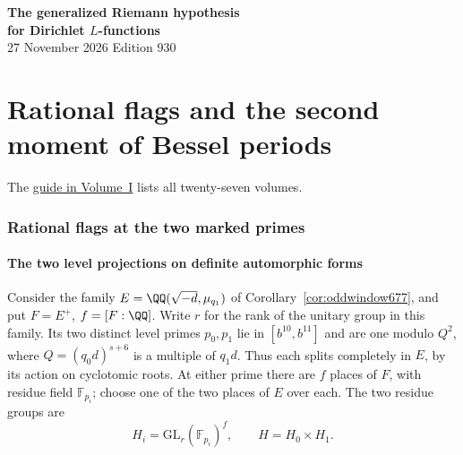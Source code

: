 \documentclass[a4paper,11pt]{article}
\theoremstyle{definition}
\theoremstyle{remark}
\numberwithin{equation}{section}
\begin{document}
\setcounter{part}{24}
\thispagestyle{plain}\begin{center}
{\LARGE\bfseries The generalized Riemann hypothesis\\[2pt]for Dirichlet \(L\)-functions}\\[6pt]
{\small 27 November 2026 \quad\textperiodcentered\quad Edition 930}\end{center}
\part{Rational flags and the second moment of Bessel periods}\label{part:XXV}
\begin{abstract}\noindent We count pairs of rational flags, separate the open and closed orbital integrals and construct the real test vector near a stationary point. The resulting Poincar\'e series give a second moment on the marked classes. Its terminal norm constraint leads to the local correlations in the next volume.\end{abstract}
\setcounter{section}{129}
\noindent The \hyperref[seriesguide]{guide in Volume~I} lists all twenty-seven volumes.
\begingroup\small\setlength{\parskip}{0pt}\tableofcontents\endgroup
\clearpage

\section{Rational flags at the two marked primes}\label{nav:two-mark-flags}\label{nav:volume-XXV}

\subsection{The two level projections on definite automorphic forms}
\label{sec:levelmass678}

Consider the family \(E=\QQ(\sqrt{-d},\mu_{q_1})\) of
Corollary~\ref{cor:oddwindow677}, and put \(F=E^+\),
\(f=[F:\QQ]\). Write \(r\) for the rank of the unitary group
in this family. Its two distinct level primes \(p_0,p_1\) lie
in \([b^{10},b^{11}]\) and are one modulo \(Q^2\), where
\(Q=(q_0d)^{s+6}\) is a multiple of \(q_1d\). Thus each splits
completely in \(E\), by its action on cyclotomic roots. At either
prime there are \(f\) places of \(F\), with residue field
\(\mathbb F_{p_i}\); choose one of the two places of \(E\)
over each. The two residue groups are
\[
       H_i=\mathrm{GL}_r(\mathbb F_{p_i})^f,\qquad H=H_0\times H_1 .
\]
\end{document}
